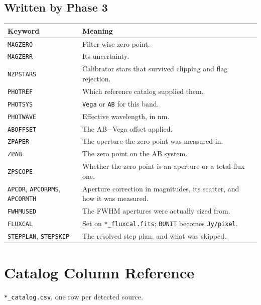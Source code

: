 \documentclass[11pt,a4paper]{article}
\begin{document}
\subsection{Written by Phase 3}
\begin{center}
\begin{longtable}{|p{3.3cm}|p{11.2cm}|}
\hline
\textbf{Keyword} & \textbf{Meaning} \\
\hline
\endhead
\texttt{MAGZERO} & Filter-wise zero point. \\
\hline
\texttt{MAGZERR} & Its uncertainty. \\
\hline
\texttt{NZPSTARS} & Calibrator stars that survived clipping and flag rejection. \\
\hline
\texttt{PHOTREF} & Which reference catalog supplied them. \\
\hline
\texttt{PHOTSYS} & \texttt{Vega} or \texttt{AB} for this band. \\
\hline
\texttt{PHOTWAVE} & Effective wavelength, in nm. \\
\hline
\texttt{ABOFFSET} & The AB$-$Vega offset applied. \\
\hline
\texttt{ZPAPER} & The aperture the zero point was measured in. \\
\hline
\texttt{ZPAB} & The zero point on the AB system. \\
\hline
\texttt{ZPSCOPE} & Whether the zero point is an aperture or a total-flux one. \\
\hline
\texttt{APCOR}, \texttt{APCORRMS}, \texttt{APCORMTH} & Aperture correction in magnitudes, its scatter, and how it was measured. \\
\hline
\texttt{FWHMUSED} & The FWHM apertures were actually sized from. \\
\hline
\texttt{FLUXCAL} & Set on \texttt{*\_fluxcal.fits}; \texttt{BUNIT} becomes \texttt{Jy/pixel}. \\
\hline
\texttt{STEPPLAN}, \texttt{STEPSKIP} & The resolved step plan, and what was skipped. \\
\hline
\end{longtable}
\end{center}

\section{Catalog Column Reference}
\texttt{*\_catalog.csv}, one row per detected source.
\end{document}
